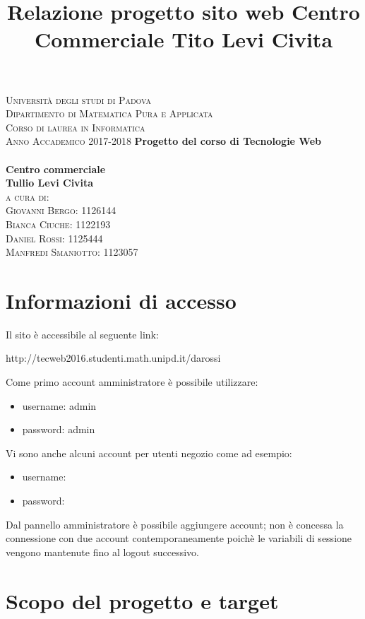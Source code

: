 \documentclass[a4paper,12pt]{article}
\begin{document}
\pagestyle{empty}	


\title{Relazione progetto sito web Centro Commerciale Tito Levi Civita}
\begin{minipage}[c][\textheight][c]{\textwidth}\centering
	\textsc{Universit\`a degli studi di Padova}
	\\ \noindent
	\textsc{Dipartimento di Matematica Pura e Applicata}
	\\ \noindent 
	\textsc{Corso di laurea in Informatica}
	\\ \noindent
	\textsc{Anno Accademico 2017-2018}
	\vfill
	\textbf{\large Progetto del corso di Tecnologie Web}
	\\ \hfill \\
	\textbf{\huge Centro commerciale\\ Tullio Levi Civita\\}
	\vfill
	\textsc{\Large a cura di:}
	\\ \noindent
	\textsc{\Large Giovanni Bergo:		1126144\\ Bianca Ciuche:		1122193 \\Daniel Rossi:		1125444\\ Manfredi Smaniotto:	1123057\\}	
\end{minipage}

\tableofcontents
\pagebreak
\section{Informazioni di accesso}
Il sito è accessibile al seguente link:
\begin{center}
	http://tecweb2016.studenti.math.unipd.it/darossi
\end{center}
Come primo account amministratore è possibile utilizzare:
\begin{itemize}
	\item username: admin
	\item password: admin
\end{itemize}
Vi sono anche alcuni account per utenti negozio come ad esempio:
\begin{itemize}
	\item username:
	\item password:
\end{itemize}
Dal pannello amministratore è possibile aggiungere account; non è concessa la connessione con due account contemporaneamente poichè le variabili di sessione vengono mantenute fino al logout successivo.
\section{Scopo del progetto e target}
\end{document}
